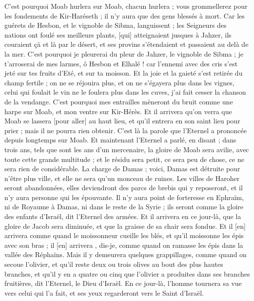 \begin{multicols}{2}
C'est pourquoi Moab hurlera sur Moab, chacun hurlera ; vous grommellerez pour les fondements de Kir-Haréseth ; il n'y aura que des gens blessés à mort.
Car les guérets de Hesbon, et le vignoble de Sibma, languissent ; les Seigneurs des nations ont foulé ses meilleurs plants, [qui] atteignaient jusques à Jahzer, ils couraient çà et là par le désert, et ses provins s'étendaient et passaient au delà de la mer.
C'est pourquoi je pleurerai du pleur de Jahzer, le vignoble de Sibma ; je t'arroserai de mes larmes, ô Hesbon et Elhalé ! car l'ennemi avec des cris s'est jeté sur tes fruits d'Eté, et sur ta moisson.
Et la joie et la gaieté s'est retirée du champ fertile ; on ne se réjouira plus, et on ne s'égayera plus dans les vignes, celui qui foulait le vin ne le foulera plus dans les cuves, j'ai fait cesser la chanson de la vendange.
C'est pourquoi mes entrailles mèneront du bruit comme une harpe sur Moab, et mon ventre sur Kir-Hérès.
Et il arrivera qu'on verra que Moab se lassera [pour aller] au haut lieu, et qu'il entrera en son saint lieu pour prier ; mais il ne pourra rien obtenir.
C'est là la parole que l'Eternel a prononcée depuis longtemps sur Moab.
Et maintenant l'Eternel a parlé, en disant ; dans trois ans, tels que sont les ans d'un mercenaire, la gloire de Moab sera avilie, avec toute cette grande multitude ; et le résidu sera petit, ce sera peu de chose, ce ne sera rien de considérable.
\VerseOne{}La charge de Damas ; voici, Damas est détruite pour n'être plus ville, et elle ne sera qu'un monceau de ruines.
Les villes de Haroher seront abandonnées, elles deviendront des parcs de brebis qui y reposeront, et il n'y aura personne qui les épouvante.
Il n'y aura point de forteresse en Ephraïm, ni de Royaume à Damas, ni dans le reste de la Syrie ; ils seront comme la gloire des enfants d'Israël, dit l'Eternel des armées.
Et il arrivera en ce jour-là, que la gloire de Jacob sera diminuée, et que la graisse de sa chair sera fondue.
Et il [en] arrivera comme quand le moissonneur cueille les blés, et qu'il moissonne les épis avec son bras ; il [en] arrivera , dis-je, comme quand on ramasse les épis dans la vallée des Réphaïns.
Mais il y demeurera quelques grappillages, comme quand on secoue l'olivier, et qu'il reste deux ou trois olives au bout des plus hautes branches, et qu'il y en a quatre ou cinq que l'olivier a produites dans ses branches fruitières, dit l'Eternel, le Dieu d'Israël.
En ce jour-là, l'homme tournera sa vue vers celui qui l'a fait, et ses yeux regarderont vers le Saint d'Israël.

\end{multicols}
